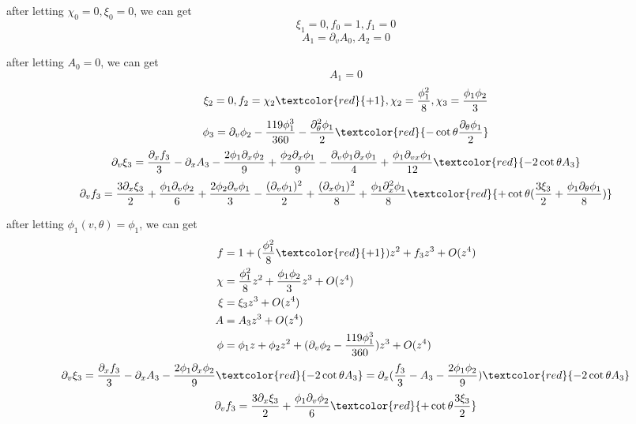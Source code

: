 \documentclass[12pt,a4paper]{ctexart}
\numberwithin{equation}{section}
\begin{document}
after letting $\chi_0=0,\xi_0=0$, we can get
\begin{equation}
    \xi_1=0,f_0=1,f_1=0
\end{equation}
\begin{equation}
    A_1=\partial_v A_0,A_2=0
\end{equation}

after letting $A_0=0$, we can get
\begin{equation}
    A_1=0
\end{equation}
\begin{equation}
    \xi_2=0,f_2=\chi_2\textcolor{red}{+1},\chi_2=\frac{\phi_1^2}{8},\chi_3=\frac{\phi_1\phi_2}{3}
\end{equation}
\begin{equation}
    \phi_3=\partial_v\phi_2-\frac{119\phi_1^3}{360}-\frac{\partial_\theta^2\phi_1}{2}\textcolor{red}{-\cot\theta\frac{\partial_\theta\phi_1}{2}}
\end{equation}
\begin{equation}
    \partial_v\xi_3=\frac{\partial_x f_3}{3}-\partial_x A_3-\frac{2\phi_1\partial_x\phi_2}{9}+\frac{\phi_2\partial_x\phi_1}{9}-\frac{\partial_v\phi_1\partial_x\phi_1}{4}+\frac{\phi_1\partial_{vx}\phi_1}{12}\textcolor{red}{-2\cot\theta A_3}
\end{equation}
\begin{equation}
    \partial_v f_3=\frac{3\partial_x\xi_3}{2}+\frac{\phi_1\partial_v\phi_2}{6}+\frac{2\phi_2\partial_v\phi_1}{3}-\frac{(\partial_v\phi_1)^2}{2}+\frac{(\partial_x\phi_1)^2}{8}+\frac{\phi_1\partial_x^2\phi_1}{8}\textcolor{red}{+\cot\theta(\frac{3\xi_3}{2}+\frac{\phi_1\partial_\theta\phi_1}{8})}
\end{equation}

after letting $\phi_1(v,\theta)=\phi_1$, we can get
\begin{equation}
    \begin{aligned}
        f&=1+(\frac{\phi_1^2}{8}\textcolor{red}{+1})z^2+f_3 z^3+O(z^4)\\
        \chi&=\frac{\phi_1^2}{8}z^2+\frac{\phi_1\phi_2}{3}z^3+O(z^4)\\
        \xi&=\xi_3 z^3+O(z^4)\\
        A&=A_3 z^3+O(z^4)\\
        \phi&=\phi_1 z+\phi_2 z^2+(\partial_v\phi_2-\frac{119\phi_1^3}{360})z^3+O(z^4)\\
    \end{aligned}
\end{equation}
\begin{equation}
    \partial_v\xi_3=\frac{\partial_x f_3}{3}-\partial_x A_3-\frac{2\phi_1\partial_x\phi_2}{9}\textcolor{red}{-2\cot\theta A_3}=\partial_x(\frac{ f_3}{3}-A_3-\frac{2\phi_1\phi_2}{9})\textcolor{red}{-2\cot\theta A_3}
\end{equation}
\begin{equation}
    \partial_v f_3=\frac{3\partial_x\xi_3}{2}+\frac{\phi_1\partial_v\phi_2}{6}\textcolor{red}{+\cot\theta\frac{3\xi_3}{2}}
\end{equation}
\end{document}
